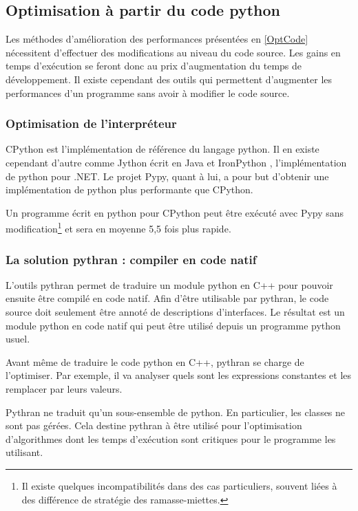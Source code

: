 \documentclass[a4paper]{article}
\begin{document}
\subsection{Optimisation à partir du code python}

Les méthodes d'amélioration des performances présentées en \ref{OptCode} nécessitent d'effectuer des modifications au niveau du code source. Les gains en temps d'exécution se feront donc au prix d'augmentation du temps de développement. Il existe cependant des outils qui permettent d'augmenter les performances d'un programme sans avoir à modifier le code source.

\subsubsection{Optimisation de l'interpréteur}

CPython est l'implémentation de référence du langage python. Il en existe cependant d'autre comme Jython écrit en Java et IronPython , l'implémentation de python pour .NET. Le projet Pypy, quant à lui, a pour but d'obtenir une implémentation de python plus performante que CPython.

Un programme écrit en python pour CPython peut être exécuté avec Pypy sans modification\footnote{Il existe quelques incompatibilités dans des cas particuliers, souvent liées à des différence de stratégie des ramasse-miettes\cite{PypyDiff}.} et sera en moyenne 5,5 fois plus rapide\cite{PypySpeed}.

\subsubsection{La solution pythran : compiler en code natif}

L'outils pythran permet de traduire un module python en C++ pour pouvoir ensuite être compilé en code natif. Afin d'être utilisable par pythran, le code source doit seulement être annoté de descriptions d'interfaces. Le résultat est un module python en code natif qui peut être utilisé depuis un programme python usuel.

Avant même de traduire le code python en C++, pythran se charge de l'optimiser. Par exemple, il va analyser quels sont les expressions constantes et les remplacer par leurs valeurs.

Pythran ne traduit qu'un sous-ensemble de python. En particulier, les classes ne sont pas gérées. Cela destine pythran à être utilisé pour l'optimisation d'algorithmes dont les temps d'exécution sont critiques pour le programme les utilisant.
\end{document}
